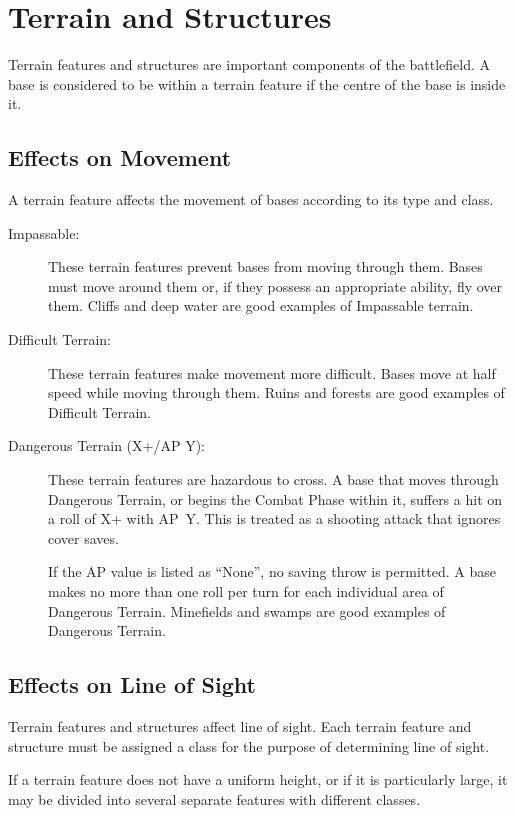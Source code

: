 \section{Terrain and Structures}

Terrain features and structures are important components of the battlefield. A base is considered to be within a terrain feature if the centre of the base is inside it.

\subsection{Effects on Movement}

A terrain feature affects the movement of bases according to its type and class.

\begin{description}
    \item[Impassable:] These terrain features prevent bases from moving through them. Bases must move around them or, if they possess an appropriate ability, fly over them. Cliffs and deep water are good examples of Impassable terrain.

    \item[Difficult Terrain:] These terrain features make movement more difficult. Bases move at half speed while moving through them. Ruins and forests are good examples of Difficult Terrain.

    \item[Dangerous Terrain (X+/AP Y):] These terrain features are hazardous to cross. A base that moves through Dangerous Terrain, or begins the Combat Phase within it, suffers a hit on a roll of X+ with AP~Y. This is treated as a shooting attack that ignores cover saves.

    If the AP value is listed as ``None'', no saving throw is permitted. A base makes no more than one roll per turn for each individual area of Dangerous Terrain. Minefields and swamps are good examples of Dangerous Terrain.
\end{description}

\subsection{Effects on Line of Sight}

Terrain features and structures affect line of sight. Each terrain feature and structure must be assigned a class for the purpose of determining line of sight.

If a terrain feature does not have a uniform height, or if it is particularly large, it may be divided into several separate features with different classes.

